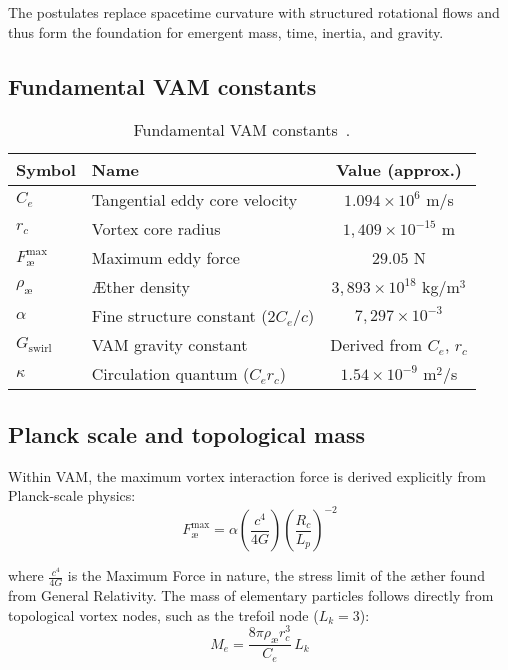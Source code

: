 The postulates replace spacetime curvature with structured rotational flows and thus form the foundation for emergent mass, time, inertia, and gravity.

\subsection*{Fundamental VAM constants}

\begin{table}[htbp]
    \centering
    \begin{tabular}{llc}
        \hline
        \toprule
        \textbf{Symbol} & \textbf{Name} & \textbf{Value (approx.)} \\
        \hline
        \midrule
        $C_e$ & Tangential eddy core velocity & $1.094 \times 10^6$ m/s \\
        $r_c$ & Vortex core radius & $1,409 \times 10^{-15}$ m \\
        $F^{\text{max}}_{\text{\ae}}$ & Maximum eddy force & $29.05$ N \\
        $\rho_\text{\ae}$ & Æther density & $3,893 \times 10^{18}$ kg/m$^3$ \\
        $\alpha$ & Fine structure constant ($2 C_e/c$) & $7,297 \times 10^{-3}$\\
        $G_\text{swirl}$ & VAM gravity constant & Derived from $C_e$, $r_c$\\
        $\kappa$ & Circulation quantum ($C_e r_c$) & $1.54 \times 10^{-9}$ m$^2$/s \\
        \hline
        \bottomrule
    \end{tabular}
    \caption{Fundamental VAM constants~\cite{vam2025field}.}
    \label{tab:VAMconstants}
\end{table}

\subsection*{Planck scale and topological mass}

Within VAM, the maximum vortex interaction force is derived explicitly from Planck-scale physics:
\begin{equation}
    F^{\text{max}}_{\text{\ae}} = \alpha  \left(\frac{c^4}{4G}\right) \left(\frac{R_c}{L_p}\right)^{-2}
\end{equation}

where $\frac{c^4}{4G}$ is the Maximum Force in nature, the stress limit of the æther found from General Relativity.
The mass of elementary particles follows directly from topological vortex nodes, such as the trefoil node ($L_k=3$):
\begin{equation}
    M_e = \frac{8\pi \rho_\text{\ae} r_c^3}{C_e}\, L_k
\end{equation}

